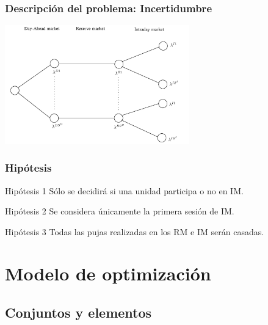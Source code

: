 \documentclass[xcolor=dvipsnames, utf8, spanish]{beamer} %
\begin{document}
\begin{frame}
	\frametitle{Descripción del problema: Incertidumbre}
	\begin{center}
		\includegraphics[width=8cm]{figuras/zuhaitza.jpg}
	\end{center}
\end{frame}


\begin{frame}
	\frametitle{Hipótesis}
	\begin{exampleblock} {Hipótesis 1}
		Sólo se decidirá si una unidad participa o no en IM.
	\end{exampleblock}
	\bigskip 
	\begin{exampleblock} {Hipótesis 2}
		Se considera únicamente la primera sesión de IM.
	\end{exampleblock}
	\bigskip 
	\begin{exampleblock} {Hipótesis 3}
		Todas las pujas realizadas en los RM e IM serán casadas.
	\end{exampleblock}
\end{frame}



\section{Modelo de optimización}

\subsection{Conjuntos y elementos}
\end{document}
